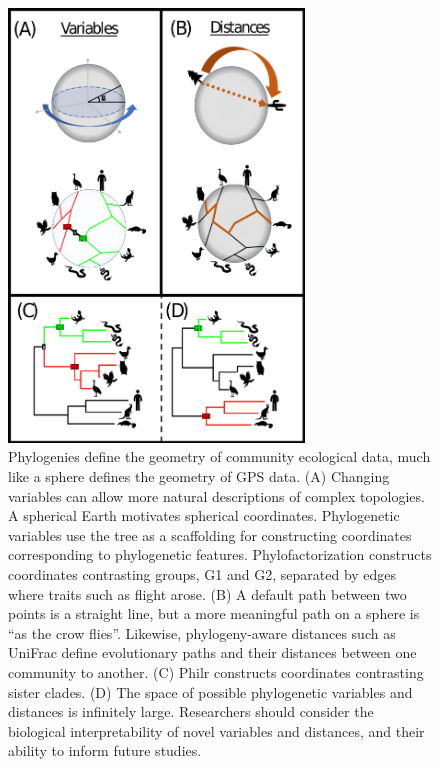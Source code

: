\begin{figure}[H]
        \centering
        \includegraphics[width=0.7\textwidth]{ch1/figure2.png}
        \caption[A comparison between phylogenetic variable analysis and phylogenetic distances.]
        {Phylogenies define the geometry of community ecological data, much like a sphere defines the geometry of GPS data. (A) Changing variables can allow more natural descriptions of complex topologies. A spherical Earth motivates spherical coordinates. Phylogenetic variables use the tree as a scaffolding for constructing coordinates corresponding to phylogenetic features. Phylofactorization constructs coordinates contrasting groups, G1 and G2, separated by edges where traits such as flight arose. (B) A default path between two points is a straight line, but a more meaningful path on a sphere is “as the crow flies”. Likewise, phylogeny-aware distances such as UniFrac define evolutionary paths and their distances between one community to another. (C) Ph\gls{ilr} constructs coordinates contrasting sister clades. (D) The space of possible phylogenetic variables and distances is infinitely large. Researchers should consider the biological interpretability of novel variables and distances, and their ability to inform future studies.}
        \label{figa2}
\end{figure}
